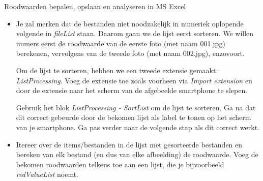 \begin{opdracht}{Roodwaarden bepalen, opslaan en analyseren in MS Excel}
\begin{enumerate}
\begin{itemize}
			In de \emph{Blocks}-view gebruik je het blok \emph{TaifunFile - FileListAsync} om alle bestanden in de genoteerde map op te lijsten. Dit blok gaat alle bestanden in de gevraagde map \emph{directoryName} en met de gevraagde extensie \emph{extension} oplijsten. Als je bij \emph{includeSubDirectories} \texttt{true} zet, worden ook submappen meegenomen in de oplijsting. Als \emph{includeSubDirectories} \texttt{false} is, wordt enkel de map zelf bekeken. 

			De oplijsting is \emph{asynchroon}: dat wil zeggen dat de smartphone andere processen kan uitvoeren tijdens de oplijsting. Maar dat betekent ook dat we niet weten wanneer de bestanden opgelijst zijn. Daarom gebruiken we ook het blok \emph{TaifunFile - AfterFileListSync}. Dit blok wordt geactiveerd wanneer alle bestanden opgelijst zijn, en dan kunnen we verder met onze berekeningen. Binnen dit blok hebben we een variabele \emph{fileList} waarin alle bestanden in de gevraagde map met de gevraagde extensie opgenomen zijn.
			
			Ga even na dat de bestanden in de gevraagde map correct opgelijst worden, door de variabele \emph{filelist} als label te tonen op het scherm van je smartphone. Ga pas verder naar de volgende stap als dit correct werkt.
			
			\item Je zal merken dat de bestanden niet noodzakelijk in numeriek oplopende volgende in \emph{fileList} staan. Daarom gaan we de lijst eerst sorteren. We willen immers eerst de roodwaarde van de eerste foto (met naam 001.jpg) berekenen, vervolgens van de tweede foto (met naam 002.jpg), enzovoort.
			
			Om de lijst te sorteren, hebben we een tweede extensie gemaakt: \emph{ListProcessing}. Voeg de extensie toe zoals voorheen via \emph{Import extension} en door de extensie naar het scherm van de afgebeelde smartphone te slepen.
			
			Gebruik het blok \emph{ListProcessing - SortList} om de lijst te sorteren. Ga na dat dit correct gebeurde door de bekomen lijst als label te tonen op het scherm van je smartphone. Ga pas verder naar de volgende stap als dit correct werkt.
			
			\item Itereer over de items/bestanden in de lijst met gesorteerde bestanden en bereken van elk bestand (en dus van elke afbeelding) de roodwaarde. Voeg de bekomen roodwaarden telkens toe aan een lijst, die je bijvoorbeeld \emph{redValueList} noemt.
			

\end{itemize}
\end{enumerate}
\end{opdracht}
